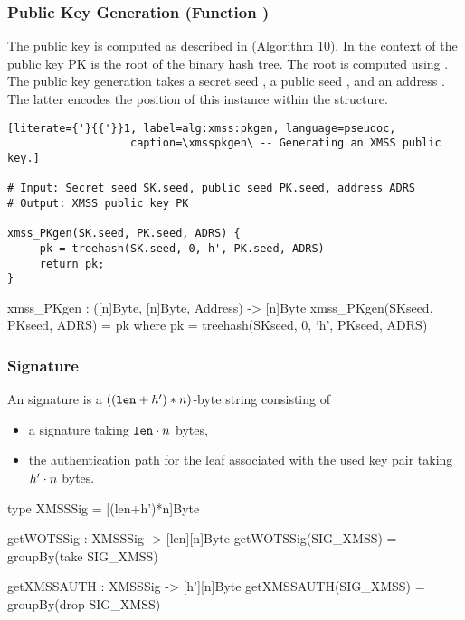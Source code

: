 \subsubsection{\xmss Public Key Generation (Function \xmsspkgen)}
   The \xmss public key is computed as described in \xmsspkgen (Algorithm
   10). In the context of \spx the \xmss public key PK is the root of
   the binary hash tree. The root is computed using \treehash.
   The public key generation takes a secret seed \sseed, a public seed \pseed,
   and an address \adrs. The latter encodes the position of this \xmss instance
   within the \spx structure.

\begin{lstlisting}[literate={'}{{'}}1, label=alg:xmss:pkgen, language=pseudoc,
                   caption=\xmsspkgen\ -- Generating an XMSS public key.]

# Input: Secret seed SK.seed, public seed PK.seed, address ADRS
# Output: XMSS public key PK

xmss_PKgen(SK.seed, PK.seed, ADRS) {
     pk = treehash(SK.seed, 0, h', PK.seed, ADRS)
     return pk;
}

\end{lstlisting}

\begin{code}
  xmss_PKgen : ([n]Byte, [n]Byte, Address) -> [n]Byte
  xmss_PKgen(SKseed, PKseed, ADRS) = pk where
    pk = treehash(SKseed, 0, `h', PKseed, ADRS)
\end{code}

\subsubsection{\xmss Signature}

   An \xmss signature is a $((\texttt{len} + {h'}) * n)$-byte string consisting
   of
   \begin{itemize}
	\item a \wotsp signature \wotssig taking $\texttt{len} \cdot n$ bytes,
	\item the authentication path \auth for the leaf associated
	      with the used \wotsp key pair taking ${h'} \cdot n$ bytes.
   \end{itemize}

\begin{code}
  type XMSSSig = [(len+h')*n]Byte

  getWOTSSig : XMSSSig -> [len][n]Byte
  getWOTSSig(SIG_XMSS) = groupBy(take SIG_XMSS)

  getXMSSAUTH : XMSSSig -> [h'][n]Byte
  getXMSSAUTH(SIG_XMSS) = groupBy(drop SIG_XMSS)
\end{code}

